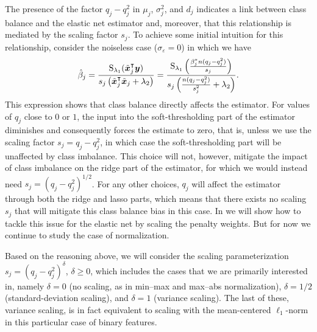 The presence of the factor \(q_j - q_j^2\) in \(\mu_j\), \(\sigma_j^2\), and \(d_j\)
indicates a link between class balance and the elastic net estimator and, moreover, that
this relationship is mediated by the scaling factor \(s_j\). To achieve some initial
intuition for this relationship, consider the noiseless case (\(\sigma_\varepsilon = 0\))
in which we have
\begin{equation}
  \label{eq:noiseless-estimator}
  \hat{\beta}_j = \frac{\operatorname{S}_{\lambda_1}(\tilde{\bm{x}}_j^\intercal \bm{y})}{s_j\left(\tilde{\bm{x}}_j^\intercal \tilde{\bm{x}}_j + \lambda_2\right)}
  =
  \frac{\operatorname{S}_{\lambda_1}\left(\frac{\beta_j^* n (q_j - q_j^2)}{s_j}\right)}{s_j\left(\frac{n(q_j - q_j^2)}{s_j^2} + \lambda_2\right)}.
\end{equation}
%
This expression shows that class balance directly affects the estimator. For values of
\(q_j\) close to \(0\) or \(1\), the input into the soft-thresholding part of the estimator
diminishes and consequently forces the estimate to zero, that is, unless we use the scaling
factor \(s_j = q_j - q_j^2\), in which case the soft-thresholding part will be unaffected
by class imbalance. This choice will not, however, mitigate the impact of class imbalance
on the ridge part of the estimator, for which we would instead need \(s_j = (q_j -
q_j^2)^{1/2}\). For any other choices, \(q_j\) will affect the estimator through both the
ridge and lasso parts, which means that there exists no scaling \(s_j\) that will mitigate
this class balance bias in this case. In  we will show how to
tackle this issue for the elastic net by scaling the penalty weights. But for now we
continue to study the case of normalization.

Based on the reasoning above, we will consider the scaling parameterization \(s_j =
(q_j-q_j^2)^\delta\), \(\delta \geq 0\), which includes the cases that we are primarily
interested in, namely \(\delta = 0\) (no scaling, as in min--max and max--abs
normalization), \(\delta = 1/2\) (standard-deviation scaling), and \(\delta = 1\) (variance
scaling). The last of these, variance scaling, is in fact equivalent to scaling with the
mean-centered \(\ell_1\)-norm in this particular case of binary features.

